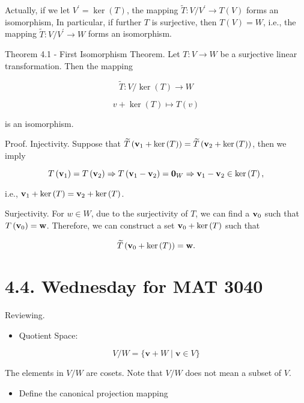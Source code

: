 \documentclass[11pt]{article}
\begin{document}
Actually, if we let \({V}^{\prime } = \ker \left( T\right)\), the mapping \(\widetilde{T} : V/{V}^{\prime } \rightarrow  T\left( V\right)\) forms an isomorphism, In particular, if further \(T\) is surjective, then \(T\left( V\right)  = W\), i.e., the mapping \(\widetilde{T} : V/{V}^{\prime } \rightarrow  W\) forms an isomorphism.

Theorem 4.1 - First Isomorphism Theorem. Let \(T : V \rightarrow  W\) be a surjective linear transformation. Then the mapping

\[
\widetilde{T} : V/\ker \left( T\right)  \rightarrow  W
\]

\[
v + \ker \left( T\right)  \mapsto  T\left( v\right)
\]

is an isomorphism.

Proof. Injectivity. Suppose that \(\widetilde{T}\left( {{\bf v}_1 + \ker \left( T\right) }\right)  = \widetilde{T}\left( {{\bf v}_2 + \ker \left( T\right) }\right)\), then we imply

\[
T\left( {\bf v}_1\right)  = T\left( {\bf v}_2\right)  \Rightarrow  T\left( {{\bf v}_1 - {\bf v}_2}\right)  = {\mathbf{0}}_{W} \Rightarrow  {\bf v}_1 - {\bf v}_2 \in  \ker \left( T\right) ,
\]

i.e., \({\bf v}_1 + \ker \left( T\right)  = {\bf v}_2 + \ker \left( T\right)\).

Surjectivity. For \(w \in  W\), due to the surjectivity of \(T\), we can find a \({\bf v}_{0}\) such that \(T\left( {\bf v}_{0}\right)  = \mathbf{w}\). Therefore, we can construct a set \({\bf v}_{0} + \ker \left( T\right)\) such that

\[
\widetilde{T}\left( {{\bf v}_{0} + \ker \left( T\right) }\right)  = \mathbf{w}.
\]

\section*{4.4. Wednesday for MAT 3040}

Reviewing.

\begin{itemize}
\item Quotient Space:
\end{itemize}

\[
V/W = \{ \mathbf{v} + W \mid  \mathbf{v} \in  V\}
\]

The elements in \(V/W\) are cosets. Note that \(V/W\) does not mean a subset of \(V\).

\begin{itemize}
\item Define the canonical projection mapping
\end{itemize}
\end{document}

